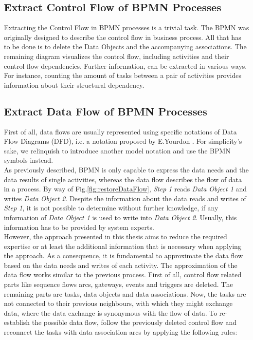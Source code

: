 \subsection{Extract Control Flow of BPMN Processes}
Extracting the Control Flow in BPMN processes is a trivial task. The BPMN was originally designed to describe the control flow in business process. All that has to be done is to delete the Data Objects and the accompanying associations. The remaining diagram visualizes the control flow, including activities and their control flow dependencies. Further information, can be extracted in various ways. For instance, counting the amount of tasks between a pair of activities provides information about their structural dependency.

\subsection{Extract Data Flow of BPMN Processes}
First of all, data flows are usually represented using specific notations of Data Flow Diagrams (DFD), i.e. a notation proposed by E.Yourdon \cite{YourdonDFD}. For simplicity's sake, we relinquish to introduce another model notation and use the BPMN symbols instead. \\
As previously described, BPMN is only capable to express the data needs and the data results of single activities, whereas the data flow describes the flow of data in a process. By way of Fig.\ref{fig:restoreDataFlow}, \textit{Step 1} reads \textit{Data Object 1} and writes \textit{Data Object 2}. Despite the information about the data reads and writes of \textit{Step 1}, it is not possible to determine without further knowledge, if any information of \textit{Data Object 1} is used to write into \textit{Data Object 2}. Usually, this information has to be provided by system experts. \\
However, the approach presented in this thesis aims to reduce the required expertise or at least the additional information that is necessary when applying the approach. 
As a consequence, it is fundamental to approximate the data flow based on the data needs and writes of each activity. The approximation of the data flow works similar to the previous process. First of all, control flow related parts like sequence flows arcs, gateways, events and triggers are deleted. The remaining parts are tasks, data objects and data associations. Now, the tasks are not connected to their previous neighbours, with which they might exchange data, where the data exchange is synonymous with the flow of data.
To re-establish the possible data flow, follow the previously deleted control flow and reconnect the tasks with data association arcs by applying the following rules:


